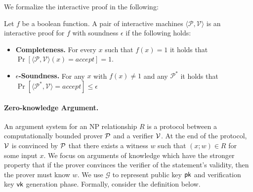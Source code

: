 We formalize the interactive proof in the following:	
\begin{definition}\label{def:ip}
	Let $f$ be a boolean function. A pair of interactive machines $\langle\mathcal{P}, \mathcal{V}\rangle$ is an interactive proof for $f$ with soundness $\epsilon$ if the following holds:
	\begin{itemize}
		\item {\bf Completeness.} For every $x$ such that $f(x) = 1$ it holds that $\Pr[\langle\mathcal{P}, \mathcal{V}\rangle(x)=accept]=1$.
		\item {\bf $\epsilon$-Soundness.} For any $x$ with $f(x) \neq 1$ and any $\mathcal{P}^*$ it holds that $\Pr[\langle\mathcal{P^*},\mathcal{V}\rangle=accept] \le \epsilon$
	\end{itemize}
\end{definition}


\paragraph{Zero-knowledge Argument.} An argument system for an NP relationship $R$ is a protocol between a computationally bounded prover $\P$ and a verifier $\V$. At the end of the protocol, $\V$ is convinced by $\P$ that there exists a witness $w$ such that $(x; w) \in R$ for some input $x$. We focus on arguments of knowledge which have the stronger property that if the prover convinces the verifier of the statement’s validity, then the prover must know $w$. We use $\mathcal{G}$ to represent public key $\pk$ and verification key $\vk$ generation phase. Formally, consider the definition below.

